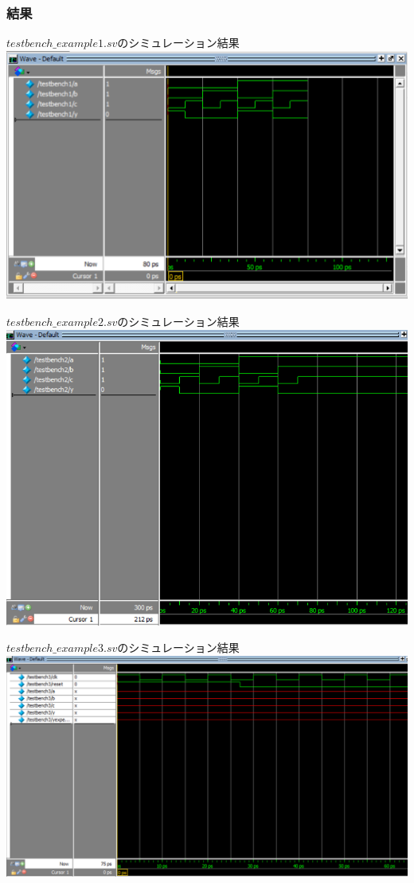 \documentclass[a4paper]{jarticle}
\begin{document}
\subsubsection{結果}
\begin{center}
	$testbench\_example1.sv$のシミュレーション結果
	\includegraphics[width=15cm]{1-m-1.PNG}
\end{center}
\begin{center}
	$testbench\_example2.sv$のシミュレーション結果
	\includegraphics[width=15cm]{1-m-2.PNG}
\end{center}
\begin{center}
	$testbench\_example3.sv$のシミュレーション結果
	\includegraphics[width=15cm]{1-m-3.PNG}
\end{center}
\end{document}
